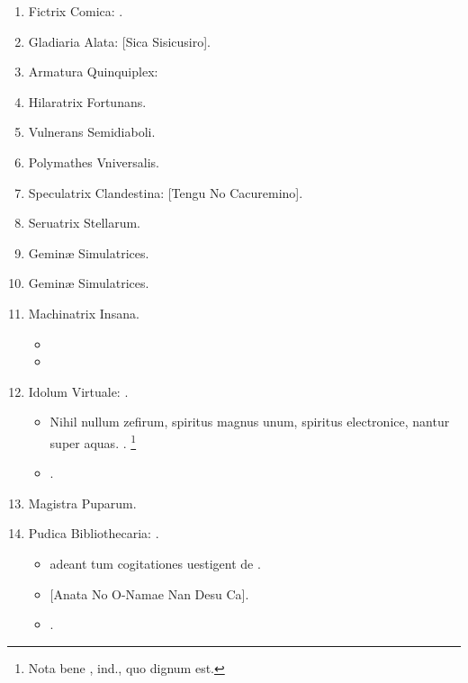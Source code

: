 \documentclass[12pt]{book}
\begin{document}
\begin{enumerate}
  \item Fictrix Comica: .
  \item Gladiaria Alata: [Sica Sisicusiro].
  \item Armatura Quinquiplex: 
  \item Hilaratrix Fortunans.
  \item Vulnerans Semidiaboli.
  \item Polymathes Vniversalis.
  \item Speculatrix Clandestina: [Tengu No Cacuremino].
  \item Seruatrix Stellarum.
  \item Geminæ Simulatrices.
  \item Geminæ Simulatrices.
  \item Machinatrix Insana.
        \begin{itemize}
          \item {}
          \item {}
        \end{itemize}

  \item Idolum Virtuale: .
        \begin{itemize}
          \item
                Nihil nullum zefirum, spiritus magnus unum,
                spiritus electronice, nantur super aquas.
                .%
                \footnote{%
                  Nota bene , ind., quo dignum est.
                }
          \item \textenglish{.}
        \end{itemize}

  \item Magistra Puparum.
  \item Pudica Bibliothecaria: .
        \begin{itemize}
          \item {}  adeant tum cogitationes uestigent de .
          \item {}[Anata No O-Namae Nan Desu Ca].
          \item {}.
        \end{itemize}


\end{enumerate}
\end{document}
